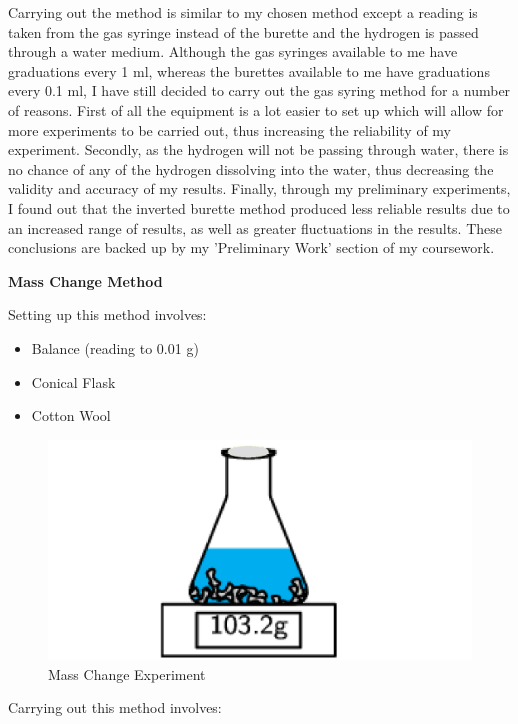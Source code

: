 Carrying out the method is similar to my chosen method except a reading is taken from the gas syringe instead of the burette and the hydrogen is passed through a water medium. Although the gas syringes available to me have graduations every 1 ml, whereas the burettes available to me have graduations every 0.1 ml, I have still decided to carry out the gas syring method for a number of reasons. First of all the equipment is a lot easier to set up which will allow for more experiments to be carried out, thus increasing the reliability of my experiment. Secondly, as the hydrogen will not be passing through water, there is no chance of any of the hydrogen dissolving into the water, thus decreasing the validity and accuracy of my results. Finally, through my preliminary experiments, I found out that the inverted burette method produced less reliable results due to an increased range of results, as well as greater fluctuations in the results. These conclusions are backed up by my 'Preliminary Work' section of my coursework. 

\textbf{Mass Change Method}

Setting up this method involves:
\begin{itemize}
\item Balance (reading to 0.01 g)
\item Conical Flask
\item Cotton Wool
\end{itemize}

\begin{figure}[H]
    \includegraphics[width=\textwidth]{./Planning/Images/MassChange.pdf}
    \caption{Mass Change Experiment} \label{fig:Mass Change}
\end{figure}


Carrying out this method involves:

